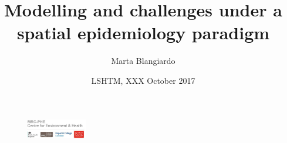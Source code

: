 \documentclass[slidestop,compress,serif,10pt, handout]{beamer}
\title[]{Modelling and challenges under a spatial epidemiology paradigm}
\author[Marta Blangiardo]{Marta Blangiardo}
\institute[]{Imperial College London \\ MRC-PHE Centre for Environment and Heath\\
\scriptsize m.blangiardo@imperial.ac.uk\\
\vspace{12pt}
}
\date[]{LSHTM, XXX October 2017}
\begin{document}
\begin{frame}
\maketitle
\begin{center}
\begin{figure}
\includegraphics[height=0.87cm, width=3.4cm]{LogoNew.jpg}
\end{figure}
\end{center}
\end{frame}

\end{document}
